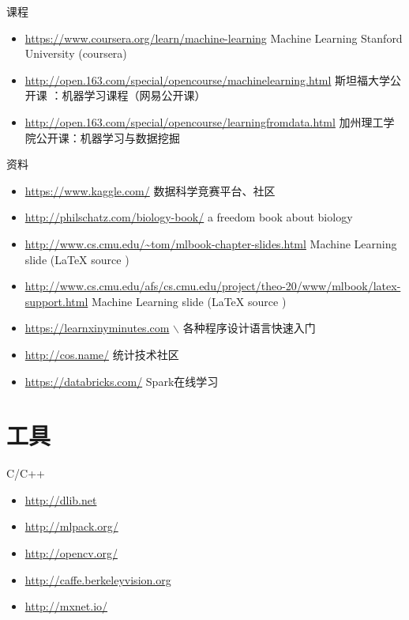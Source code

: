 \documentclass[presentation]{beamer}
\begin{document}
\begin{frame}[label={sec:org947c739}]{课程}
\begin{itemize}
\item \url{https://www.coursera.org/learn/machine-learning}  Machine Learning Stanford University (coursera)
\item \url{http://open.163.com/special/opencourse/machinelearning.html}  斯坦福大学公开课 ：机器学习课程（网易公开课）
\item \url{http://open.163.com/special/opencourse/learningfromdata.html} 加州理工学院公开课：机器学习与数据挖掘
\end{itemize}
\end{frame}


\begin{frame}[label={sec:org160efc6}]{资料}
\begin{itemize}
\item \url{https://www.kaggle.com/}
数据科学竞赛平台、社区
\item \url{http://philschatz.com/biology-book/}  
a  freedom book about biology
\item \href{http://www.cs.cmu.edu/\~tom/mlbook-chapter-slides.html}{http://www.cs.cmu.edu/\textasciitilde tom/mlbook-chapter-slides.html}
Machine Learning slide (\LaTeX{} source )
\item \url{http://www.cs.cmu.edu/afs/cs.cmu.edu/project/theo-20/www/mlbook/latex-support.html} 
Machine Learning slide (\LaTeX{} source )
\item \url{https://learnxinyminutes.com}  $\backslash$
各种程序设计语言快速入门
\item \url{http://cos.name/}
统计技术社区
\item \url{https://databricks.com/}
Spark在线学习
\end{itemize}
\end{frame}

\section{工具}
\label{sec:org4997cf6}
\begin{frame}[label={sec:org9331cb3}]{C/C++}
\begin{itemize}
\item \url{http://dlib.net}
\item \url{http://mlpack.org/}
\item \url{http://opencv.org/}
\item \url{http://caffe.berkeleyvision.org}
\item \url{http://mxnet.io/}
\end{itemize}
\end{frame}
\end{document}
